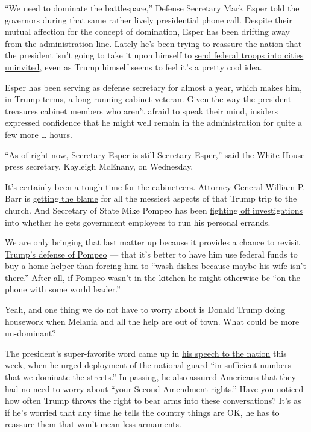 ``We need to dominate the battlespace,'' Defense Secretary Mark Esper
told the governors during that same rather lively presidential phone
call. Despite their mutual affection for the concept of domination,
Esper has been drifting away from the administration line. Lately he's
been trying to reassure the nation that the president isn't going to
take it upon himself to
\href{https://www.washingtonpost.com/history/2020/06/03/insurrection-act-trump-history/}{send
federal troops into cities uninvited}, even as Trump himself seems to
feel it's a pretty cool idea.

Esper has been serving as defense secretary for almost a year, which
makes him, in Trump terms, a long-running cabinet veteran. Given the way
the president treasures cabinet members who aren't afraid to speak their
mind, insiders expressed confidence that he might well remain in the
administration for quite a few more \ldots{} hours.

``As of right now, Secretary Esper is still Secretary Esper,'' said the
White House press secretary, Kayleigh McEnany, on Wednesday.

It's certainly been a tough time for the cabineteers. Attorney General
William P. Barr is
\href{https://www.washingtonpost.com/politics/barr-personally-ordered-removal-of-protesters-near-white-house-leading-to-use-of-force-against-largely-peaceful-crowd/2020/06/02/0ca2417c-a4d5-11ea-b473-04905b1af82b_story.html}{getting
the blame} for all the messiest aspects of that Trump trip to the
church. And Secretary of State Mike Pompeo has been
\href{https://www.nytimes.com/2020/05/17/us/politics/pompeo-inspector-general-steve-linick.html}{fighting
off investigations} into whether he gets government employees to run his
personal errands.

We are only bringing that last matter up because it provides a chance to
revisit
\href{https://thehill.com/homenews/administration/498403-trump-on-pompeo-id-rather-have-him-working-than-doing-dishes-because}{Trump's
defense of Pompeo} --- that it's better to have him use federal funds to
buy a home helper than forcing him to ``wash dishes because maybe his
wife isn't there.'' After all, if Pompeo wasn't in the kitchen he might
otherwise be ``on the phone with some world leader.''

Yeah, and one thing we do not have to worry about is Donald Trump doing
housework when Melania and all the help are out of town. What could be
more un-dominant?

The president's super-favorite word came up in
\href{https://www.whitehouse.gov/briefings-statements/statement-by-the-president-39/}{his
speech to the nation} this week, when he urged deployment of the
national guard ``in sufficient numbers that we dominate the streets.''
In passing, he also assured Americans that they had no need to worry
about ``your Second Amendment rights.'' Have you noticed how often Trump
throws the right to bear arms into these conversations? It's as if he's
worried that any time he tells the country things are OK, he has to
reassure them that won't mean less armaments.

